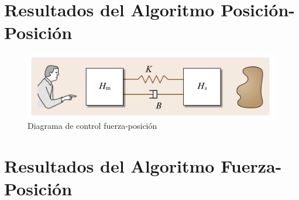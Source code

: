 	
 	

%


%


 	





\newpage
\section{Resultados del Algoritmo Posición-Posición}


\begin{figure}[htb!]
\includegraphics[scale=0.7]{FiguresP/pos-posArq}
\caption{Diagrama de control fuerza-posición}
\end{figure}





\newpage
\section{Resultados del Algoritmo Fuerza-Posición}

